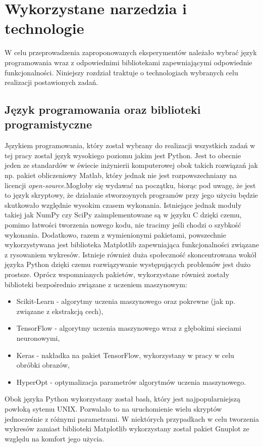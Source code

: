 \section{Wykorzystane narzedzia i technologie} \label{tools}
W celu przeprowadzenia zaproponowanych eksperymentów należało wybrać język programowania wraz z odpowiednimi bibliotekami zapewniającymi odpowiednie funkcjonalności. Niniejszy rozdział traktuje o technologiach wybranych celu realizacji postawionych zadań.
\subsection{Język programowania oraz biblioteki programistyczne}
Językiem programowania, który został wybrany do realizacji wszystkich zadań w tej pracy został język wysokiego poziomu jakim jest Python. Jest to obecnie jeden ze standardów w świecie inżynierii komputerowej obok takich rozwiązań jak np. pakiet obliczeniowy Matlab, który jednak nie jest rozpowszechniany na licencji \textit{open-source}.Mogłoby się wydawać na początku, biorąc pod uwagę, że jest to język skryptowy, że działanie stworzoynych programów przy jego użyciu będzie skutkowało względnie wysokim czasem wykonania. Istniejące jednak moduły takiej jak NumPy czy SciPy zaimplementowane są w języku C dzięki czemu, pomimo łatwości tworzenia nowego kodu, nie tracimy jeśli chodzi o szybkość wykonania. Dodatkowo, razem z wymienionymi pakietami, powszechnie wykorzystywana jest biblioteka Matplotlib zapewniająca funkcjonalności związane z rysowaniem wykresów. Istnieje również duża społeczność skoncentrowana wokół języka Python dzięki czemu rozwiązywanie występujących problemów jest dużo prostsze. Oprócz wspomnianych pakietów, wykorzystane również zostały biblioteki bezpośrednio związane z uczeniem maszynowym:
\begin{itemize}
\item Scikit-Learn - algorytmy uczenia maszynowego oraz pokrewne (jak np. związane z ekstrakcją cech),
\item TensorFlow - algorytmy uczenia maszynowego wraz z głębokimi sieciami neuronowymi,
\item Keras - nakładka na pakiet TensorFlow, wykorzystany w pracy w celu obróbki obrazów,
\item HyperOpt - optymalizacja parametrów algorytmów uczenia maszynowego.
\end{itemize}
Obok języka Python wykorzystany został bash, który jest najpopularniejszą powłoką sytemu UNIX. Pozwalało to na uruchomienie wielu skryptów jednocześnie z różnymi parametrami. W niektórych przypadkach w celu tworzenia wykresów zamiast biblioteki Matplotlib wykorzystany został pakiet Gnuplot ze względu na komfort jego użycia.

